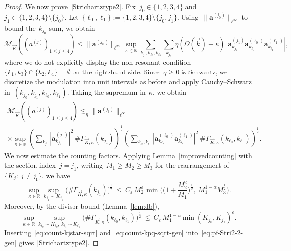 \documentclass[11pt,reqno,english]{amsart}
\numberwithin{equation}{section}
\theoremstyle{plain}
\theoremstyle{definition}
\theoremstyle{remark}
\newcommand{\R}{\mathbb{R}}
\begin{document}
\begin{proof}
	We now prove~\eqref{Strichartztype2}.
	Fix~$j_0\in\{1,2,3,4\}$ and~$j_1\in\{1,2,3,4\}\setminus\{j_0\}$.
	Let~$\{\ell_{0},\ell_{1}\}:=\{1,2,3,4\}\setminus\{j_0,j_1\}$.
	Using~$\|\mathbf{a}^{(j_0)}\|_{\ell^\infty}$ to bound the~$k_{j_0}$-sum, we obtain
	\begin{equation}
		\label{eq:pf-Stri2-1-gen}
		\mathcal{M}_{\vec{K}}((a^{(j)})_{1\leq j\leq 4})
		\le
		\|\mathbf{a}^{(j_0)}\|_{\ell^\infty}\,
		\sup_{\kappa\in\R}
		\sum_{k_{j_1},k_{\ell_0},k_{\ell_1}}
		\sum_{k_{j_0}}
		\eta(\Omega(\vec k)-\kappa)\,
		|\mathbf{a}^{(j_1)}_{k_{j_1}}\mathbf{a}^{(\ell_{0})}_{k_{\ell_{0}}}\mathbf{a}^{(\ell_{1})}_{k_{\ell_{1}}}|,
	\end{equation}
	where we do not explicitly display the non-resonant condition~$\{k_1,k_3\}\cap\{k_2,k_4\}=\emptyset$ on the right-hand side.
	Since~$\eta\ge0$ is Schwartz, we discretize the modulation into unit intervals as before and apply Cauchy--Schwarz in~$(k_{j_0},k_{j_1},k_{\ell_{0}},k_{\ell_{1}})$.
	Taking the supremum in~$\kappa$, we obtain
	\begin{multline}\label{eq:pf-Stri2-2-gen}
		\mathcal{M}_{\vec{K}}((a^{(j)})_{1\leq j\leq 4})
		\lesssim_\eta
		\|\mathbf{a}^{(j_0)}\|_{\ell^\infty}\,
		\\
		\times\sup_{\kappa\in\R}
		\left(
		\sum_{k_{j_1}}|\mathbf{a}^{(j_1)}_{k_{j_1}}|^2\ \#\Gamma_{\vec K,\kappa}(k_{j_1})
		\right)^{\frac12}
		\left(
		\sum_{k_{\ell_{0}},k_{\ell_{1}}}|\mathbf{a}^{(\ell_{0})}_{k_{\ell_{0}}}\mathbf{a}^{(\ell_{1})}_{k_{\ell_{1}}}|^2\ \#\Gamma_{\vec K,\kappa}(k_{\ell_{0}},k_{\ell_{1}})\right)^{\frac12}.
	\end{multline}
	We now estimate the counting factors.
	Applying Lemma~\ref{improvedcounting} with the section index~$j=j_1$,
	writing~$M_1\ge M_2\ge M_3$ for the rearrangement of~$\{K_j:\ j\neq j_1\}$, we have
	\begin{equation}\label{eq:count-kjstar-sqrt}
		\sup_{\kappa\in\R}\sup_{k_{j_1}\sim K_{j_1}}
		\big(\#\Gamma_{\vec K,\kappa}(k_{j_1})\big)^{\frac12}
		\ \le\
		C_\varepsilon\,M_2^{\varepsilon}\,
		\min\Big(\Big(1+\frac{M_2^2}{M_1}\Big)^{\frac12},\ M_1^{1-\alpha}M_3^{\frac12}\Big).
	\end{equation}
	Moreover, by the divisor bound (Lemma~\ref{lem:db}),
	\begin{equation}\label{eq:count-kpq-sqrt-gen}
		\sup_{\kappa\in\R}\sup_{k_{\ell_0}\sim K_{\ell_0},\ k_{\ell_1}\sim K_{\ell_1}}
		\big(\#\Gamma_{\vec K,\kappa}(k_{\ell_0},k_{\ell_1})\big)^{\frac12}
		\ \le\
		C_\varepsilon\,M_1^{1-\alpha}\min(K_{j_0},K_{j_1})^{\varepsilon}.
	\end{equation}
	Inserting~\eqref{eq:count-kjstar-sqrt} and~\eqref{eq:count-kpq-sqrt-gen} into~\eqref{eq:pf-Stri2-2-gen}
	gives~\eqref{Strichartztype2}.
\end{proof}
\end{document}
